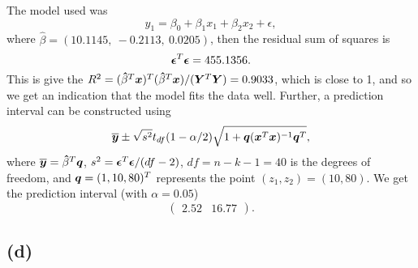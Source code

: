 The model used was
\begin{equation*}
  y_1 = \beta_0 + \beta_1 x_1 + \beta_2 x_2 + \epsilon,
\end{equation*}
where $\hat{\beta} = (10.1145,\   -0.2113,\    0.0205)$, then the
residual sum of squares is
\begin{equation*}
  \bm{\epsilon}^{T} \bm{\epsilon} = 455.1356.
\end{equation*}
This is give the $R^{2} = (\bm{\hat} \beta^{T} \bm{x})^{T} (\bm{\hat}
\beta^{T} \bm{x})/(\bm{Y}^{T} \bm{Y}) = 0.9033$, which is close to 1, and so
we get an indication that the model fits the data well. 
Further, a prediction interval can be constructed using
\begin{equation*}
  \overline{\bm{y}} \pm \sqrt{s^{2}}t_{df}(1 - \alpha/2)\sqrt{1 + \bm{q} (\bm{x}^{T} \bm{x})^{-1}\bm{q}^{T}},
\end{equation*}
where $\overline{\bm{y}} = \bm{\hat} \beta^{T} \bm{q}$, $s^{2} =\bm{\epsilon}^{T} \bm{\epsilon} / (df - 2) $, $df = n - k - 1
= 40$ is the degrees of freedom, and $\bm{q} = (1, 10, 80)^{T}$ represents
the point $(z_{1}, z_{2}) = (10, 80)$.  We get the prediction interval
(with $\alpha = 0.05$)
\begin{equation*}
  \begin{pmatrix}
    2.52 &16.77 
  \end{pmatrix}.
\end{equation*}

\subsection*{(d)}

